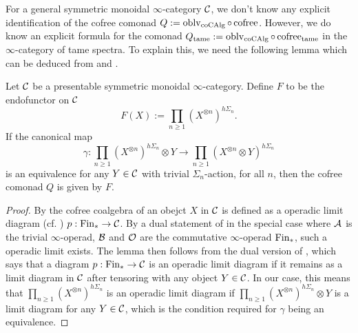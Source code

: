 For a general symmetric monoidal $\infty$-category ${\mathcal{C}}$, we don't know any explicit identification of the cofree comonad $Q:=\operatorname{oblv}_{\operatorname{coCAlg}}\circ \operatorname{cofree}$. 
However, we do know an explicit formula for the comonad $Q_{\operatorname{\operatorname{tame}}}:=\operatorname{oblv}_{\operatorname{coCAlg}}\circ \operatorname{cofree}_{\operatorname{\operatorname{tame}}}$ in the $\infty$-category of tame spectra. To explain this, we need the following lemma which can be deduced from \cite[Proposition 3.1.3.3]{HA} and \cite[Example 3.1.1.17]{HA}.
\begin{lemma}
\label{Cofree commutative coalgebra}
Let ${\mathcal{C}}$ be a presentable symmetric monoidal $\infty$-category.
Define $F$ to be the endofunctor on ${\mathcal{C}}$
$$
F(X):= \prod_{n\geq 1} (X^{\otimes n})^{h\Sigma_n}.
$$
If the canonical map 
$$
\gamma: \prod_{n\geq 1} (X^{\otimes n})^{h\Sigma_n} \otimes Y \to 
\prod_{n\geq 1} (X^{\otimes n} \otimes Y)^{h\Sigma_n}
$$
is an equivalence for any $Y\in {\mathcal{C}}$ with trivial $\Sigma_n$-action, for all $n$,
then the cofree comonad $Q$ is given by $F$.
\end{lemma}
\begin{proof}
    By \cite[Definition 3.1.3.1.]{HA} the cofree coalgebra of an obejct $X$ in ${\mathcal{C}}$ is defined as a operadic limit diagram (cf. \cite[Definition 3.1.1.2.]{HA}) $p:\operatorname{Fin}_{*} \to {\mathcal{C}}$.
    By a dual statement of \cite[Proposition 3.1.3.3]{HA} in the special case where ${\mathcal{A}}$ is the trivial $\infty$-operad, ${\mathcal{B}}$ and ${\mathcal{O}}$ are the commutative $\infty$-operad $\operatorname{Fin}_{*}$, such a operadic limit exists.
    The lemma then follows from the dual version of \cite[Example 3.1.1.17]{HA}, which says that a diagram $p:\operatorname{Fin}_{*} \to {\mathcal{C}}$ is an operadic limit diagram if it remains as a limit diagram in ${\mathcal{C}}$ after tensoring with any object $Y\in{\mathcal{C}}$. 
    In our case, this means that $\prod_{n\geq 1} (X^{\otimes n})^{h\Sigma_n}$ is an operadic limit diagram if 
    $\prod_{n\geq 1} (X^{\otimes n})^{h\Sigma_n} \otimes Y$ is a limit diagram for any $Y\in {\mathcal{C}}$, which is the condition required for $\gamma$ being an equivalence.
    
\end{proof}

